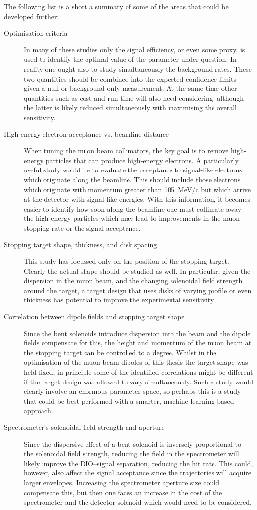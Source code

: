 The following list is a short a summary of some of the areas that could be developed further:
\begin{description}
\item[ Optimisation criteria]
	In many of these studies only the signal efficiency, or even some proxy, is used to identify the optimal value of the parameter under question.
	In reality one ought also to study simultaneously the background rates.  
	These two quantities should be combined into the expected confidence limits given a null or background-only measurement.
	At the same time other quantities such as cost and run-time will also need considering, although the latter is likely reduced simultaneously with maximising the overall sensitivity.
\item[ High-energy electron acceptance vs. beamline distance ]
	When tuning the muon beam collimators, the key goal is to remove high-energy particles that can produce high-energy electrons. 
	A particularly useful study would be to evaluate the acceptance to signal-like electrons which originate along the beamline.
	This should include those electrons which originate with momentum greater than 105~MeV/c but which arrive at the detector with signal-like energies.
	With this information, it becomes easier to identify how soon along the beamline one must collimate away the high-energy particles which may lead to improvements in the muon stopping rate or the signal acceptance.
\item[ Stopping target shape, thickness, and disk spacing ]
	This study has focussed only on the position of the stopping target.
	Clearly the actual shape should be studied as well. In particular, given the dispersion in the muon beam, and the changing solenoidal field strength around the target, a target design that uses disks of varying profile or even thickness has potential to improve the experimental sensitivity.  
\item[ Correlation between dipole fields and stopping target shape ]
	Since the bent solenoids introduce dispersion into the beam and the dipole fields compensate for this, the height and momentum of the muon beam at the stopping target can be controlled to a degree.
	Whilst in the optimisation of the muon beam dipoles of this thesis the target shape was held fixed, in principle some of the identified correlations might be different if the target design was allowed to vary simultaneously.  
	Such a study would clearly involve an enormous parameter space, so perhaps this is a study that could be best performed with a smarter, machine-learning based approach.
\item[ Spectrometer's solenoidal field strength and aperture]
	Since the dispersive effect of a bent solenoid is inversely proportional to the solenoidal field strength, reducing the field in the spectrometer will likely improve the DIO--signal separation, reducing the hit rate.
	This could, however, also affect the signal acceptance since the trajectories will acquire larger envelopes.
	Increasing the spectrometer aperture size could compensate this, but then one faces an increase in the cost of the spectrometer and the detector solenoid which would need to be considered.
\end{description}
